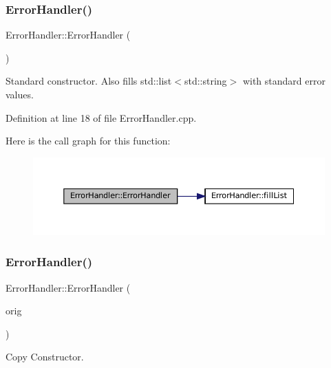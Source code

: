 \subsubsection{\texorpdfstring{ErrorHandler()}{ErrorHandler()}\hspace{0.1cm}{\footnotesize\ttfamily [1/2]}}
{\footnotesize\ttfamily Error\+Handler\+::\+Error\+Handler (\begin{DoxyParamCaption}{ }\end{DoxyParamCaption})}



Standard constructor. Also fills std\+::list$<$std\+::string$>$ with standard error values. 



Definition at line 18 of file Error\+Handler.\+cpp.

Here is the call graph for this function\+:\nopagebreak
\begin{figure}[H]
\begin{center}
\leavevmode
\includegraphics[width=350pt]{classErrorHandler_a7e5f379bd231442b898cef94556b2107_cgraph}
\end{center}
\end{figure}
\mbox{\label{classErrorHandler_add20b373ee276ee2ef040f6dd913a86b}} 
\subsubsection{\texorpdfstring{ErrorHandler()}{ErrorHandler()}\hspace{0.1cm}{\footnotesize\ttfamily [2/2]}}
{\footnotesize\ttfamily Error\+Handler\+::\+Error\+Handler (\begin{DoxyParamCaption}\item[{const \mbox{\hyperlink{classErrorHandler}{Error\+Handler}} \&}]{orig }\end{DoxyParamCaption})}



Copy Constructor. 


